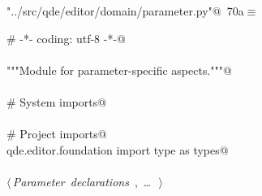 \documentclass[
    a4paper,      %
    10pt,         %
    openright,    %
    notitlepage,  %
    parskip=half, %
]{scrreprt}       %
\theoremstyle{definition}                    %
\begin{document}
\begin{flushleft} \small
\begin{minipage}{\linewidth}\label{scrap120}\raggedright\small
{} \verb@"../src/qde/editor/domain/parameter.py"@\nobreak\ {\footnotesize {70a}}$\equiv$
\vspace{-1ex}
\begin{list}{}{} \item
\mbox{}\lstinline@# -*- coding: utf-8 -*-@\\
\mbox{}\lstinline@@\\
\mbox{}\lstinline@"""Module for parameter-specific aspects."""@\\
\mbox{}\lstinline@@\\
\mbox{}\lstinline@# System imports@\\
\mbox{}\lstinline@@\\
\mbox{}\lstinline@# Project imports@\\
\mbox{}\lstinline@from qde.editor.foundation import type as types@\\
\mbox{}\lstinline@@\\
\mbox{}\lstinline@@\hbox{$\langle\,${\itshape Parameter declarations}\nobreak\ {\footnotesize {}, \ldots\ }$\,\rangle$}\lstinline@@\\
\mbox{}\lstinline@@{\NWsep}
\end{list}
\vspace{-1.5ex}
\footnotesize
\begin{list}{}{\setlength{\itemsep}{-\parsep}\setlength{\itemindent}{-\leftmargin}}

\item{}
\end{list}
\end{minipage}\vspace{4ex}
\end{flushleft}
\end{document}
